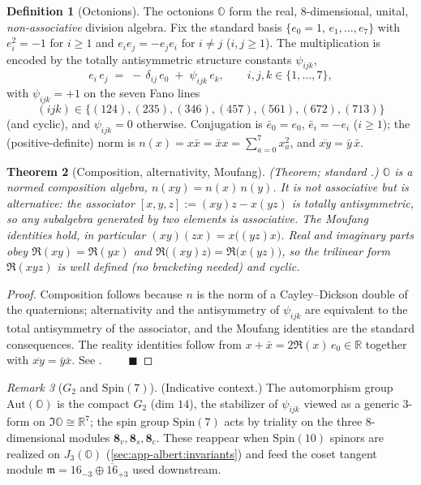 \documentclass[11pt]{article}
\theoremstyle{plain}
\newtheorem{theorem}{Theorem}[section]
\theoremstyle{definition}
\newtheorem{definition}[theorem]{Definition}
\theoremstyle{remark}
\newtheorem{remark}[theorem]{Remark}
\begin{document}
\begin{definition}[Octonions]\label{def:app-albert:octonions}
The octonions $\mathbb O$ form the real, $8$-dimensional, unital,
\emph{non-associative} division algebra. Fix the standard basis
$\{e_0=1,\,e_1,\dots,e_7\}$ with $e_i^2=-1$ for $i\ge 1$ and $e_i e_j=-e_j e_i$
for $i\neq j$ ($i,j\ge 1$). The multiplication is encoded by the totally
antisymmetric structure constants $\psi_{ijk}$,
\begin{equation}\label{eq:app-albert:struct}
  e_i\, e_j \;=\; -\,\delta_{ij}\,e_0 \;+\; \psi_{ijk}\,e_k ,
  \qquad i,j,k\in\{1,\dots,7\},
\end{equation}
with $\psi_{ijk}=+1$ on the seven Fano lines
\begin{equation}\label{eq:app-albert:fano}
  (ijk)\in\bigl\{(124),(235),(346),(457),(561),(672),(713)\bigr\}
\end{equation}
(and cyclic), and $\psi_{ijk}=0$ otherwise. Conjugation is
$\bar e_0=e_0$, $\bar e_i=-e_i$ ($i\ge1$); the (positive-definite) norm is
$n(x)=x\bar x=\bar x x=\sum_{a=0}^{7}x_a^2$, and $\overline{xy}=\bar y\,\bar x$.
\end{definition}

\begin{theorem}[Composition, alternativity, Moufang]\label{thm:app-albert:moufang}
\textup{(Theorem; standard \cite{Baez:2002,Springer:2000}.)}
$\mathbb O$ is a normed composition algebra, $n(xy)=n(x)\,n(y)$. It is not
associative but is \emph{alternative}: the associator
$[x,y,z]:=(xy)z-x(yz)$ is totally antisymmetric, so any subalgebra generated by
two elements is associative. The Moufang identities hold, in particular
$(xy)(zx)=x\bigl((yz)x\bigr)$. Real and imaginary parts obey
$\Re(xy)=\Re(yx)$ and $\Re\bigl((xy)z\bigr)=\Re\bigl(x(yz)\bigr)$, so the
trilinear form $\Re(xyz)$ is well defined (no bracketing needed) and cyclic.
\end{theorem}

\begin{proof}
Composition follows because $n$ is the norm of a Cayley--Dickson double of the
quaternions; alternativity and the antisymmetry of $\psi_{ijk}$ are equivalent to
the total antisymmetry of the associator, and the Moufang identities are the
standard consequences. The reality identities follow from
$x+\bar x=2\Re(x)\,e_0\in\mathbb R$ together with $\overline{xy}=\bar y\bar x$.
See \cite{Baez:2002,Schafer:1966}. $\qquad\blacksquare$
\end{proof}

\begin{remark}[$G_2$ and $\mathrm{Spin}(7)$]\label{rmk:app-albert:g2}
\textup{(Indicative context.)}
The automorphism group $\mathrm{Aut}(\mathbb O)$ is the compact $G_2$ (dim $14$),
the stabilizer of $\psi_{ijk}$ viewed as a generic $3$-form on $\Im\mathbb O\cong
\mathbb R^7$; the spin group $\mathrm{Spin}(7)$ acts by triality on the three
$8$-dimensional modules $\mathbf 8_v,\mathbf 8_s,\mathbf 8_c$. These reappear when
$\mathrm{Spin}(10)$ spinors are realized on $J_3(\mathbb O)$
(\autoref{sec:app-albert:invariants}) and feed the coset tangent module
$\mathfrak m=16_{-3}\oplus\overline{16}_{+3}$ used downstream.
\end{remark}
\end{document}

